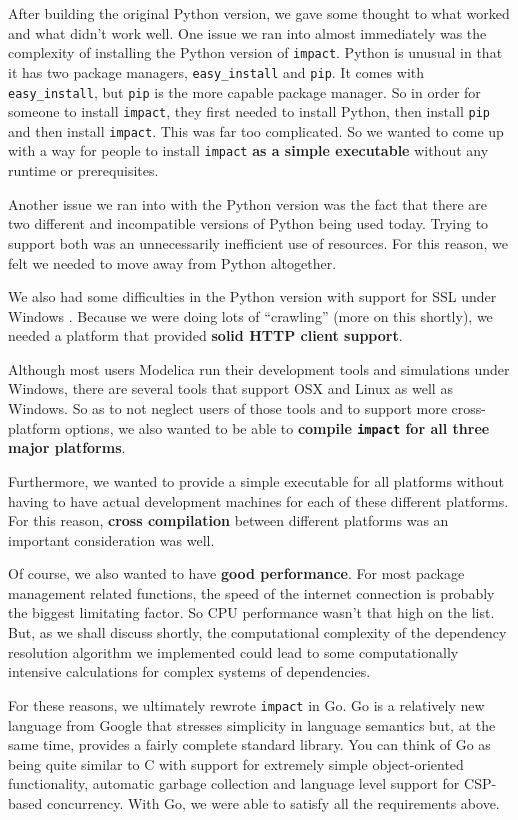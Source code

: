 \documentclass[11pt,a4paper,twocolumn]{article}
\newcommand{\code}[1]{\texttt{#1}} %
\begin{document}
After building the original Python version, we gave some thought to
what worked and what didn't work well.  One issue we ran into almost
immediately was the complexity of installing the Python version of
\code{impact}.  Python is unusual in that it has two package managers,
\code{easy\_install} and \code{pip}.  It comes with
\code{easy\_install}, but \code{pip} is the more capable package
manager.  So in order for someone to install \code{impact}, they first
needed to install Python, then install \code{pip} and then install
\code{impact}.  This was far too complicated.  So we wanted to come up
with a way for people to install \code{impact} \textbf{as a simple
  executable} without any runtime or prerequisites.

Another issue we ran into with the Python version was the fact that
there are two different and incompatible versions of Python being used
today.  Trying to support both was an unnecessarily inefficient use of
resources.  For this reason, we felt we needed to move away from
Python altogether.

We also had some difficulties in the Python version with support for
SSL under Windows \parencite{python-ssl}.  Because we were doing lots of
``crawling'' (more on this shortly), we needed a platform that
provided \textbf{solid HTTP client support}.

Although most users Modelica run their development tools and
simulations under Windows, there are several tools that support OSX
and Linux as well as Windows.  So as to not neglect users of those
tools and to support more cross-platform options, we also wanted to be
able to \textbf{compile \code{impact} for all three major platforms}.

Furthermore, we wanted to provide a simple executable for all
platforms without having to have actual development machines for each
of these different platforms.  For this reason, \textbf{cross
  compilation} between different platforms was an important
consideration was well.

Of course, we also wanted to have \textbf{good performance}.  For most
package management related functions, the speed of the internet
connection is probably the biggest limitating factor.  So CPU
performance wasn't that high on the list.  But, as we shall discuss
shortly, the computational complexity of the dependency resolution
algorithm we implemented could lead to some computationally intensive
calculations for complex systems of dependencies.

For these reasons, we ultimately rewrote \code{impact} in Go.  Go is a
relatively new language from Google that stresses simplicity in
language semantics but, at the same time, provides a fairly complete
standard library.  You can think of Go as being quite similar to C
with support for extremely simple object-oriented functionality,
automatic garbage collection and language level support for CSP-based
concurrency.  With Go, we were able to satisfy all the requirements
above.
\end{document}
